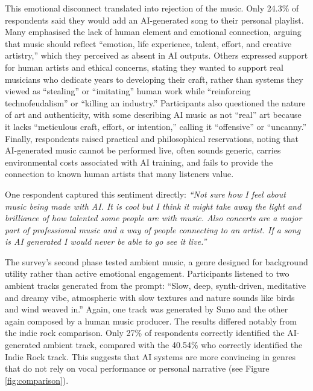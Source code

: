 \documentclass{article}
\begin{document}
This emotional disconnect translated into rejection of the music. Only 24.3\% of respondents said they would add an AI-generated song to their personal playlist. Many emphasised the lack of human element and emotional connection, arguing that music should reflect ``emotion, life experience, talent, effort, and creative artistry,'' which they perceived as absent in AI outputs. Others expressed support for human artists and ethical concerns, stating they wanted to support real musicians who dedicate years to developing their craft, rather than systems they viewed as ``stealing'' or ``imitating'' human work while ``reinforcing technofeudalism'' or ``killing an industry.'' Participants also questioned the nature of art and authenticity, with some describing AI music as not ``real'' art because it lacks ``meticulous craft, effort, or intention,'' calling it ``offensive'' or ``uncanny.'' Finally, respondents raised practical and philosophical reservations, noting that AI-generated music cannot be performed live, often sounds generic, carries environmental costs associated with AI training, and fails to provide the connection to known human artists that many listeners value.

One respondent captured this sentiment directly: \textit{``Not sure how I feel about music being made with AI. It is cool but I think it might take away the light and brilliance of how talented some people are with music. Also concerts are a major part of professional music and a way of people connecting to an artist. If a song is AI generated I would never be able to go see it live.''}

The survey's second phase tested ambient music, a genre designed for background utility rather than active emotional engagement. Participants listened to two ambient tracks generated from the prompt: ``Slow, deep, synth-driven, meditative and dreamy vibe, atmospheric with slow textures and nature sounds like birds and wind weaved in.'' Again, one track was generated by Suno and the other again composed by a human music producer. The results differed notably from the indie rock comparison. Only 27\% of respondents correctly identified the AI-generated ambient track, compared with the 40.54\% who correctly identified the Indie Rock track. This suggests that AI systems are more convincing in genres that do not rely on vocal performance or personal narrative (see Figure \ref{fig:comparison}). 
\end{document}

